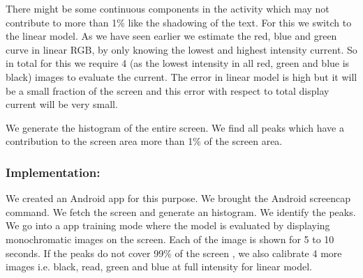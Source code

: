 \fi



There might be some continuous components in the activity which may not contribute
to more than 1\% like the shadowing of the text. For this we switch to the linear model.
As we have seen earlier we estimate the red, blue and green curve in linear RGB,
by only knowing the lowest and highest intensity current. So in total for this we
require 4 (as the lowest intensity in all red, green and blue is black) images to evaluate the current.
The error in linear model is high but it will be a small fraction of the screen and
this error with respect to total display current will be very small.

We generate the histogram of the entire screen. We find all peaks which have
a contribution to the screen area more than 1\% of the screen area.
\fi

\subsubsection{Implementation:}
We created an Android app for this purpose.
We brought the Android screencap command. We fetch
the screen and generate an histogram.
We identify the peaks. We go into a app training mode where the model is evaluated
by displaying monochromatic images on the screen. Each of the image is shown for 5 to 10
seconds.
If the peaks do not cover 99\% of the screen , we also calibrate 4 more images i.e.
black, read, green and blue at full intensity for linear model.
\fi



